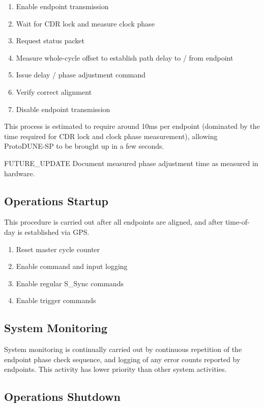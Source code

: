 \documentclass[a4paper,11pt]{article}
\begin{document}
\begin{enumerate}
	\item Enable endpoint transmission
	\item Wait for CDR lock and measure clock phase
	\item Request status packet
	\item Measure whole-cycle offset to establish path delay to / from endpoint
	\item Issue delay / phase adjustment command
	\item Verify correct alignment
	\item Disable endpoint transmission
\end{enumerate}

This process is estimated to require around 10ms per endpoint (dominated by the time required for CDR lock and clock phase measurement), allowing ProtoDUNE-SP to be brought up in a few seconds.

{\color{red}FUTURE\_UPDATE} Document measured phase adjustment time as measured in hardware.

\subsection{Operations Startup}

This procedure is carried out after all endpoints are aligned, and after time-of-day is established via GPS.

\begin{enumerate}
	\item Reset master cycle counter
	\item Enable command and input logging
	\item Enable regular S\_Sync commands
	\item Enable trigger commands
\end{enumerate}

\subsection{System Monitoring}

System monitoring is continually carried out by continuous repetition of the endpoint phase check sequence, and logging of any error counts reported by endpoints. This activity has lower priority than other system activities.

\subsection{Operations Shutdown}
\end{document}
